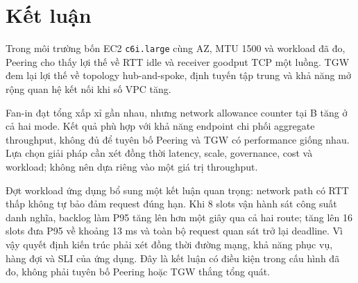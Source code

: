 \section{Kết luận}

Trong môi trường bốn EC2 \texttt{c6i.large} cùng AZ, MTU 1500 và workload đã
đo, Peering cho thấy lợi thế về RTT idle và receiver goodput TCP một luồng.
TGW đem lại lợi thế về topology hub-and-spoke, định tuyến tập trung và khả năng
mở rộng quan hệ kết nối khi số VPC tăng.

Fan-in đạt tổng xấp xỉ gần nhau, nhưng network allowance counter tại B tăng ở
cả hai mode. Kết quả phù hợp với khả năng endpoint chi phối aggregate
throughput, không đủ để tuyên bố Peering và TGW có performance giống nhau.
Lựa chọn giải pháp cần xét đồng thời latency, scale, governance, cost và
workload; không nên dựa riêng vào một giá trị throughput.

Đợt workload ứng dụng bổ sung một kết luận quan trọng: network path có RTT thấp
không tự bảo đảm request đúng hạn. Khi 8 slots vận hành sát công suất danh
nghĩa, backlog làm P95 tăng lên hơn một giây qua cả hai route; tăng lên 16 slots
đưa P95 về khoảng 13 ms và toàn bộ request quan sát trở lại deadline. Vì vậy
quyết định kiến trúc phải xét đồng thời đường mạng, khả năng phục vụ, hàng đợi
và SLI của ứng dụng. Đây là kết luận có điều kiện trong cấu hình đã đo, không
phải tuyên bố Peering hoặc TGW thắng tổng quát.
